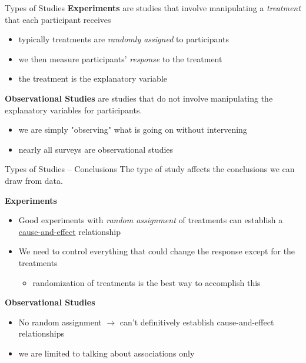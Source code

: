 \documentclass{beamer}
\begin{document}
\begin{frame}{Types of Studies}
\textbf{Experiments} are studies that involve manipulating a \textit{treatment} that each participant receives
\begin{itemize}
    \item typically treatments are \textit{randomly assigned} to participants
    \item we then measure participants' \textit{response} to the treatment
    \item the treatment is the explanatory variable
\end{itemize} \vspace{8mm}

\textbf{Observational Studies} are studies that do not involve manipulating the explanatory variables for participants. 
\begin{itemize}
    \item we are simply "observing" what is going on without intervening
    \item nearly all surveys are observational studies
\end{itemize}
\end{frame}



\begin{frame}{Types of Studies -- Conclusions}
The type of study affects the conclusions we can draw from data. \vspace{4mm}

\textbf{Experiments}
\begin{itemize}
    \item Good experiments with \textit{random assignment} of treatments can establish a \underline{cause-and-effect} relationship
    \item We need to control everything that could change the response except for the treatments
        \begin{itemize}
            \item randomization of treatments is the best way to accomplish this
        \end{itemize}
\end{itemize} \vspace{4mm}

\textbf{Observational Studies}
\begin{itemize}
    \item No random assignment $\rightarrow$ can't definitively establish cause-and-effect relationships
    \item we are limited to talking about associations only
\end{itemize}
\end{frame}
\end{document}
